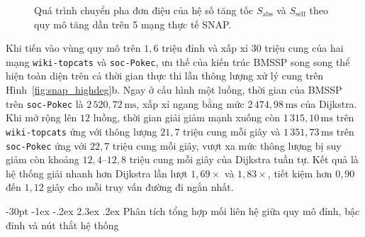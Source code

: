 \documentclass[12pt,a4paper,openany,oneside]{report}
\makeatletter
\theoremstyle{plain}
\renewcommand\section{\@startsection {section}{1}{\z@}
    {-30pt \@plus -1ex \@minus -.2ex}
    {2.3ex \@plus.2ex}
    {\normalfont\large\bfseries}}
\numberwithin{equation}{section}
\makeatother
\begin{document}
\begin{figure}[!htb]
{%
}
\caption{Quá trình chuyển pha đơn điệu của hệ số tăng tốc $S_{\mathrm{abs}}$ và $S_{\mathrm{self}}$ theo quy mô tăng dần trên 5 mạng thực tế SNAP.}
\label{fig:tikz_snap_bars}
\end{figure}

Khi tiến vào vùng quy mô trên $1{,}6$ triệu đỉnh và xấp xỉ $30$ triệu cung của hai mạng \texttt{wiki-topcats} và \texttt{soc-Pokec}, ưu thế của kiến trúc BMSSP song song thể hiện toàn diện trên cả thời gian thực thi lẫn thông lượng xử lý cung trên Hình~\ref{fig:snap_highdeg}b. Ngay ở cấu hình một luồng, thời gian của BMSSP trên \texttt{soc-Pokec} là $2\,520{,}72\,\mathrm{ms}$, xấp xỉ ngang bằng mức $2\,474{,}98\,\mathrm{ms}$ của Dijkstra. Khi mở rộng lên $12$ luồng, thời gian giải giảm mạnh xuống còn $1\,315{,}10\,\mathrm{ms}$ trên \texttt{wiki-topcats} ứng với thông lượng $21{,}7$ triệu cung mỗi giây và $1\,351{,}73\,\mathrm{ms}$ trên \texttt{soc-Pokec} ứng với $22{,}7$ triệu cung mỗi giây, vượt xa mức thông lượng bị suy giảm còn khoảng $12{,}4$--$12{,}8$ triệu cung mỗi giây của Dijkstra tuần tự. Kết quả là hệ thống giải nhanh hơn Dijkstra lần lượt $1{,}69\times$ và $1{,}83\times$, tiết kiệm hơn $0{,}90$ đến $1{,}12$ giây cho mỗi truy vấn đường đi ngắn nhất.

\section{Phân tích tổng hợp mối liên hệ giữa quy mô đỉnh, bậc đỉnh và nút thắt hệ thống}\label{sec:c3-tong-hop}
\end{document}
